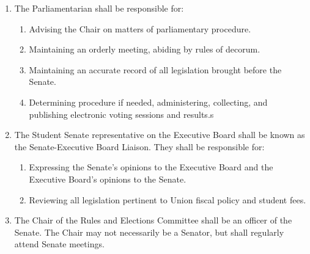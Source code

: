 \begin{enumerate}
\item The Parliamentarian shall be responsible for:
\begin{enumerate}
\item Advising the Chair on matters of parliamentary procedure.
\item Maintaining an orderly meeting, abiding by rules of decorum.
\item Maintaining an accurate record of all legislation brought before the Senate.
\item Determining procedure if needed, administering, collecting, and publishing electronic voting sessions and results.s
\end{enumerate}

\item The Student Senate representative on the Executive Board shall be known as the Senate-Executive Board Liaison. They shall be
responsible for:
\begin{enumerate}
\item Expressing the Senate’s opinions to the Executive Board and the Executive Board’s opinions to the Senate.
\item Reviewing all legislation pertinent to Union fiscal policy and student fees.
\end{enumerate}

\item The Chair of the Rules and Elections Committee shall be an officer of the Senate. The Chair may not necessarily be a Senator,
but shall regularly attend Senate meetings.

\end{enumerate}

